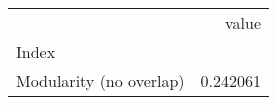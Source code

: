 \begin{tabular}{lr}
\toprule
{} &     value \\
Index                   &           \\
\midrule
Modularity (no overlap) &  0.242061 \\
\bottomrule
\end{tabular}
